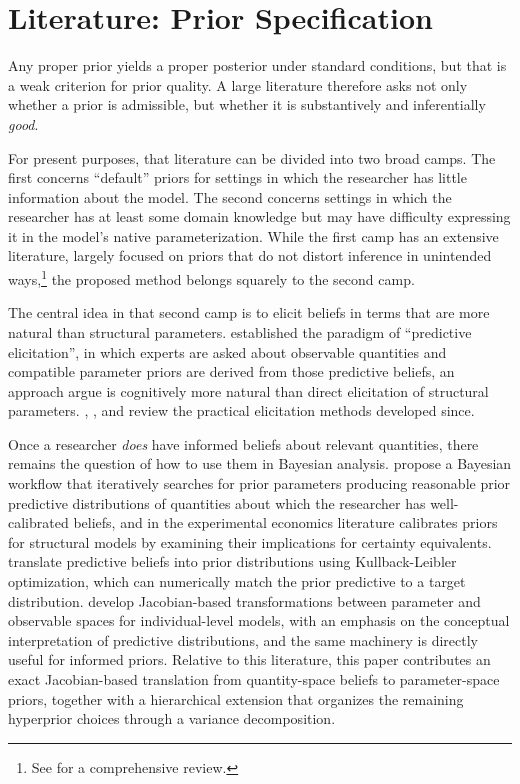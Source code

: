 \documentclass[12pt,a4paper]{article}
\theoremstyle{definition}
\theoremstyle{remark}
\begin{document}
\section{Literature: Prior Specification}
\label{sec:literature}

Any proper prior yields a proper posterior under standard conditions, but that
is a weak criterion for prior quality. A large literature therefore asks not
only whether a prior is admissible, but whether it is substantively and
inferentially \textit{good}.

For present purposes, that literature can be divided into two broad camps. The
first concerns \enquote{default} priors for settings in which the researcher has
little information about the model. The second concerns settings in which the
researcher has at least some domain knowledge but may have difficulty
expressing it in the model's native parameterization. While the first camp has
an extensive literature, largely focused on priors that do not distort
inference in unintended ways,\footnote{
  See \textcite{Consonni2018} for a comprehensive review.
} the proposed method belongs squarely to the second camp.

The central idea in that second camp is to elicit beliefs in terms that are
more natural than structural parameters. \textcite{Kadane1980} established the
paradigm of \enquote{predictive elicitation}, in which experts are asked about
observable quantities and compatible parameter priors are derived from those
predictive beliefs, an approach \textcite{KadaneWolfson1998} argue is
cognitively more natural than direct elicitation of structural parameters.
\textcite{Schlag2015}, \textcite{Garthwaite2005}, and \textcite{Mikkola2024}
review the practical elicitation methods developed since.

Once a researcher \textit{does} have informed beliefs about relevant quantities, there
remains the question of how to use them in Bayesian analysis.
\textcite{Gabry2019} propose a Bayesian workflow that
iteratively searches for prior parameters producing reasonable prior
predictive distributions of quantities about which the researcher has
well-calibrated beliefs, and in the experimental economics literature
\textcite{Bland2025} calibrates priors for structural models by examining
their implications for certainty equivalents. \textcite{Manderson2026}
translate predictive beliefs into prior distributions using Kullback-Leibler
optimization, which can numerically match the prior predictive to a target
distribution. \textcite{Segert2019} develop Jacobian-based transformations
between parameter and observable spaces for individual-level models, with an
emphasis on the conceptual interpretation of predictive distributions, and
the same machinery is directly useful for informed priors. Relative to this
literature, this paper contributes an exact Jacobian-based translation from
quantity-space beliefs to parameter-space priors, together with a hierarchical
extension that organizes the remaining hyperprior choices through a variance
decomposition.
\end{document}
